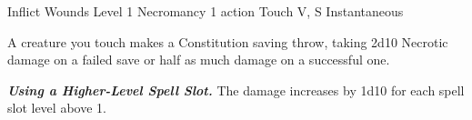 \DndSpellHeader%
    {Inflict Wounds}
    {Level 1 Necromancy}
    {1 action}
    {Touch}
    {V, S}
    {Instantaneous}

A creature you touch makes a Constitution saving throw, taking 2d10 Necrotic damage on a failed save or half as much damage on a successful one.

\textbf{\textit{Using a Higher-Level Spell Slot.}} The damage increases by 1d10 for each spell slot level above 1.
